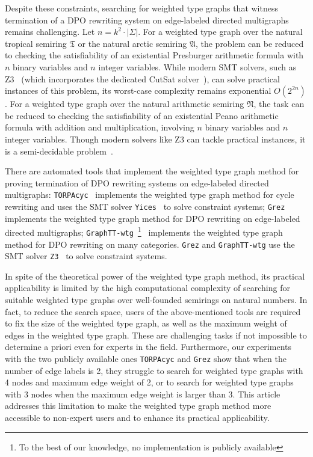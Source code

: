     Despite these constraints, searching for weighted type graphs that witness termination of a DPO rewriting system on edge-labeled directed multigraphs
    remains challenging. 
    Let $n = k^2 \cdot | \Sigma |$.
    For a weighted type graph over the natural tropical semiring $\mathfrak{T}$ or the natural arctic semiring $\mathfrak{A}$, the problem can be reduced to checking the satisfiability of an existential Presburger arithmetic formula with $n$ binary variables and $n$ integer variables.
    While modern SMT solvers, such as Z3~\cite{arithmetic2024z3} (which incorporates the dedicated CutSat solver~\cite{z3ilp_cutsat}), can solve practical instances of this problem, its worst-case complexity remains exponential \( O(2^{2n}) \).
     For a weighted type graph over the natural arithmetic semiring $\mathfrak{N}$, the task can be reduced to checking the satisfiability of an existential Peano arithmetic formula with addition and multiplication, involving $n$ binary variables and $n$ integer variables. Though modern solvers like Z3 can tackle practical instances, it is a semi-decidable problem~\cite{matiyasevivc2003enumerable}.

    There are automated tools that implement the weighted type graph method for proving termination of DPO rewriting systems on edge-labeled directed multigraphs: 
    \texttt{TORPAcyc}~\cite{TORPAcyc} implements the weighted type graph method for cycle rewriting and uses the SMT solver \texttt{Yices}~\cite{yices} to solve constraint systems;
    \texttt{Grez}~\cite{grez} implements the weighted type graph method for DPO rewriting on edge-labeled directed multigraphs; \texttt{GraphTT-wtg}~\footnote{To the best of our knowledge, no implementation is publicly available}~\cite{endrullis2024generalized_arxiv_v3} implements the weighted type graph method for DPO rewriting on many categories.
    \texttt{Grez} and \texttt{GraphTT-wtg}  
    use  the SMT solver \texttt{Z3}~\cite{de2008z3} to solve constraint systems.


    In spite of the theoretical power of the weighted type graph method, its practical applicability is limited by the high computational complexity of searching for suitable weighted type graphs over well-founded semirings on 
    natural numbers. In fact, to reduce the search space, users of the above-mentioned tools are required
     to fix the size of the weighted type graph, as well as the maximum weight of edges in the weighted type graph. These are challenging tasks if not impossible to determine a priori even for experts in the field. 
    Furthermore, our experiments with the two publicly available ones \texttt{TORPAcyc} and \texttt{Grez} show that when the number of edge labels is 2, they struggle to search for weighted type graphs with 4 nodes and maximum edge weight of 2, or to search for weighted type graphs with 3 nodes when the maximum edge weight is larger than 3. 
    This article addresses this limitation to make the weighted type graph method more accessible to non-expert users and to enhance its practical applicability.


